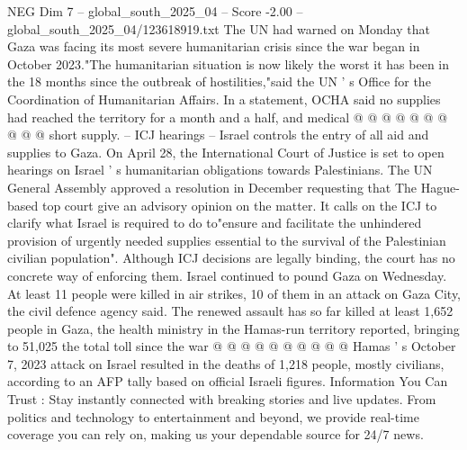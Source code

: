 \begin{textsample}{NEG Dim 7 – global\_south\_2025\_04 – Score -2.00 – global\_south\_2025\_04/123618919.txt}
The UN had warned on Monday that Gaza was facing its most severe humanitarian crisis since the war began in October 2023."The humanitarian situation is now likely the worst it has been in the 18 months since the outbreak of hostilities,"said the UN ' s Office for the Coordination of Humanitarian Affairs.
In a statement, OCHA said no supplies had reached the territory for a month and a half, and medical @ @ @ @ @ @ @ @ @ @ short supply. -- ICJ hearings -- Israel controls the entry of all aid and supplies to Gaza.
On April 28, the International Court of Justice is set to open hearings on Israel ' s humanitarian obligations towards Palestinians.
The UN General Assembly approved a resolution in December requesting that The Hague-based top court give an advisory opinion on the matter.
It calls on the ICJ to clarify what Israel is required to do to"ensure and facilitate the unhindered provision of urgently needed supplies essential to the survival of the Palestinian civilian population".
Although ICJ decisions are legally binding, the court has no concrete way of enforcing them.
Israel continued to pound Gaza on Wednesday.
At least 11 people were killed in air strikes, 10 of them in an attack on Gaza City, the civil defence agency said.
The renewed assault has so far killed at least 1,652 people in Gaza, the health ministry in the Hamas-run territory reported, bringing to 51,025 the total toll since the war @ @ @ @ @ @ @ @ @ @ Hamas ' s October 7, 2023 attack on Israel resulted in the deaths of 1,218 people, mostly civilians, according to an AFP tally based on official Israeli figures.
Information You Can Trust : Stay instantly connected with breaking stories and live updates.
From politics and technology to entertainment and beyond, we provide real-time coverage you can rely on, making us your dependable source for 24/7 news.

\end{textsample}
